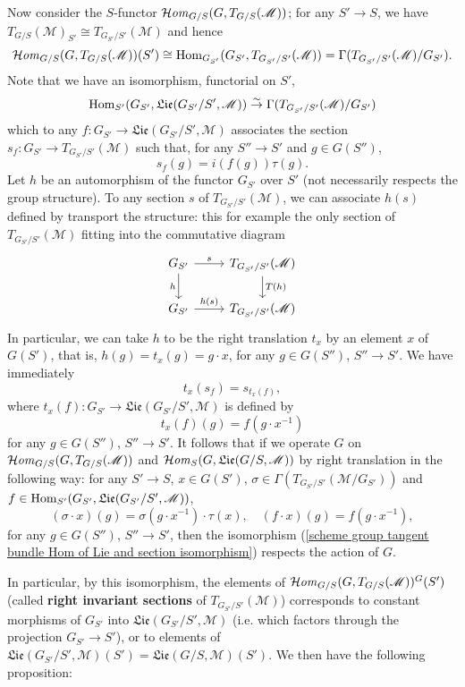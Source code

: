 Now consider the $S$-functor $\operatorname{\mathcal{H}\hspace*{-0.4pt}\textit{om}\hspace{0.5pt}}_{G/S}(G,T_{G/S}(\mathscr{M}))$; for any $S'\to S$, we have $T_{G/S}(\mathscr{M})_{S'}\cong T_{G_{S'}/S'}(\mathscr{M})$ and hence
\[\operatorname{\mathcal{H}\hspace*{-0.4pt}\textit{om}\hspace{0.5pt}}_{G/S}(G,T_{G/S}(\mathscr{M}))(S')\cong\mathrm{Hom}_{G_{S'}}(G_{S'},T_{G_{S'}/S'}(\mathscr{M}))=\Gamma(T_{G_{S'}/S'}(\mathscr{M})/G_{S'}).\]
Note that we have an isomorphism, functorial on $S'$,
\begin{equation}\label{scheme group tangent bundle Hom of Lie and section isomorphism}
\mathrm{Hom}_{S'}(G_{S'},\mathfrak{Lie}(G_{S'}/S',\mathscr{M}))\stackrel{\sim}{\to}\Gamma(T_{G_{S'}/S'}(\mathscr{M})/G_{S'})
\end{equation}
which to any $f:G_{S'}\to\mathfrak{Lie}(G_{S'}/S',\mathscr{M})$ associates the section $s_f:G_{S'}\to T_{G_{S'}/S'}(\mathscr{M})$ such that, for any $S''\to S'$ and $g\in G(S'')$,
\[s_f(g)=i(f(g))\tau(g).\]
Let $h$ be an automorphism of the functor $G_{S'}$ over $S'$ (not necessarily respects the group structure). To any section $s$ of $T_{G_{S'}/S'}(\mathscr{M})$, we can associate $h(s)$ defined by transport the structure: this for example the only section of $T_{G_{S'}/S'}(\mathscr{M})$ fitting into the commutative diagram
\[\begin{tikzcd}
G_{S'}\ar[r,"s"]\ar[d,swap,"h"]&T_{G_{S'}/S'}(\mathscr{M})\ar[d,"T(h)"]\\
G_{S'}\ar[r,"h(s)"]&T_{G_{S'}/S'}(\mathscr{M})
\end{tikzcd}\]
In particular, we can take $h$ to be the right translation $t_x$ by an element $x$ of $G(S')$, that is, $h(g)=t_x(g)=g\cdot x$, for any $g\in G(S'')$, $S''\to S'$. We have immediately
\[t_x(s_f)=s_{t_x(f)},\]
where $t_x(f):G_{S'}\to\mathfrak{Lie}(G_{S'}/S',\mathscr{M})$ is defined by
\[t_x(f)(g)=f(g\cdot x^{-1})\]
for any $g\in G(S'')$, $S''\to S'$. It follows that if we operate $G$ on  $\operatorname{\mathcal{H}\hspace*{-0.4pt}\textit{om}\hspace{0.5pt}}_{G/S}(G,T_{G/S}(\mathscr{M}))$ and $\operatorname{\mathcal{H}\hspace*{-0.4pt}\textit{om}\hspace{0.5pt}}_S(G,\mathfrak{Lie}(G/S,\mathscr{M}))$ by right translation in the following way: for any $S'\to S$, $x\in G(S')$, $\sigma\in\Gamma(T_{G_{S'}/S'}(\mathscr{M}/G_{S'}))$ and $f\in\mathrm{Hom}_{S'}(G_{S'},\mathfrak{Lie}(G_{S'}/S',\mathscr{M}))$,
\[(\sigma\cdot x)(g)=\sigma(g\cdot x^{-1})\cdot \tau(x),\quad (f\cdot x)(g)=f(g\cdot x^{-1}),\]
for any $g\in G(S'')$, $S''\to S'$, then the isomorphism (\ref{scheme group tangent bundle Hom of Lie and section isomorphism}) respects the action of $G$.\par
In particular, by this isomorphism, the elements of $\operatorname{\mathcal{H}\hspace*{-0.4pt}\textit{om}\hspace{0.5pt}}_{G/S}(G,T_{G/S}(\mathscr{M}))^G(S')$ (called \textbf{right invariant sections} of $T_{G_{S'}/S'}(\mathscr{M})$) corresponds to constant morphisms of $G_{S'}$ into $\mathfrak{Lie}(G_{S'}/S',\mathscr{M})$ (i.e. which factors through the projection $G_{S'}\to S'$), or to elements of $\mathfrak{Lie}(G_{S'}/S',\mathscr{M})(S')=\mathfrak{Lie}(G/S,\mathscr{M})(S')$. We then have the following proposition:

